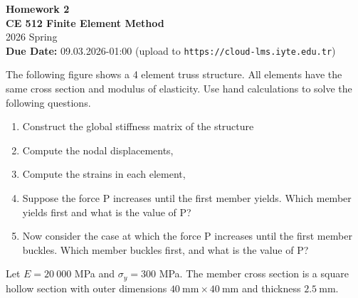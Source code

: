 \documentclass[11pt, a4paper]{article}
\begin{document}
\begin{center}
    {\Large \textbf{Homework 2}} \\[0.2cm]
    {\large \textbf{CE 512 Finite Element Method}} \\[0.1cm]
    {\large 2026 Spring} \\[0.3cm]
    \textbf{Due Date:} 09.03.2026-01:00 (upload to \texttt{https://cloud-lms.iyte.edu.tr})
\end{center}

\vspace{0.5cm}

\noindent The following figure shows a 4 element truss structure. All elements have the same cross section and modulus of elasticity. Use hand calculations to solve the following questions.

\vspace{0.2cm}

\begin{enumerate}
    \item[a)] Construct the global stiffness matrix of the structure
    \item[b)] Compute the nodal displacements,
    \item[c)] Compute the strains in each element,
    \item[d)] Suppose the force P increases until the first member yields. Which member yields first and what is the value of P?
    \item[e)] Now consider the case at which the force P increases until the first member buckles. Which member buckles first, and what is the value of P?
\end{enumerate}

\vspace{0.3cm}
\noindent Let $E=20~000$ MPa and $\sigma_{y}=300$ MPa. The member cross section is a square hollow section with outer dimensions $40~\text{mm}\times40~\text{mm}$ and thickness $2.5~\text{mm}$.
\vspace{0.5cm}
\end{document}
